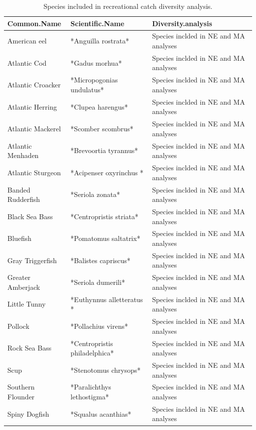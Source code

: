 \documentclass[
]{book}
\begin{document}
\begin{table}

\caption{\label{tab:rec-groups}Species included in recreational catch diversity analysis.}
\centering
\fontsize{8}{10}\selectfont
\begin{tabular}[t]{l|l|l}
\hline
Common.Name & Scientific.Name & Diversity.analysis\\
\hline
American eel & *Anguilla rostrata* & Species inclded in NE and MA analyses\\
\hline
Atlantic Cod & *Gadus morhua* & Species inclded in NE and MA analyses\\
\hline
Atlantic Croacker & *Micropogonias undulatus* & Species inclded in NE and MA analyses\\
\hline
Atlantic Herring & *Clupea harengus* & Species inclded in NE and MA analyses\\
\hline
Atlantic Mackerel & *Scomber scombrus* & Species inclded in NE and MA analyses\\
\hline
Atlantic Menhaden & *Brevoortia tyrannus* & Species inclded in NE and MA analyses\\
\hline
Atlantic Sturgeon & *Acipenser oxyrinchus * & Species inclded in NE and MA analyses\\
\hline
Banded Rudderfish & *Seriola zonata* & Species inclded in NE and MA analyses\\
\hline
Black Sea Bass & *Centropristis striata* & Species inclded in NE and MA analyses\\
\hline
Bluefish & *Pomatomus saltatrix* & Species inclded in NE and MA analyses\\
\hline
Gray Triggerfish & *Balistes capriscus* & Species inclded in NE and MA analyses\\
\hline
Greater Amberjack & *Seriola dumerili* & Species inclded in NE and MA analyses\\
\hline
Little Tunny & *Euthynnus alletteratus * & Species inclded in NE and MA analyses\\
\hline
Pollock & *Pollachius virens* & Species inclded in NE and MA analyses\\
\hline
Rock Sea Bass & *Centropristis philadelphica* & Species inclded in NE and MA analyses\\
\hline
Scup & *Stenotomus chrysops* & Species inclded in NE and MA analyses\\
\hline
Southern Flounder & *Paralichthys lethostigma* & Species inclded in NE and MA analyses\\
\hline
Spiny Dogfish & *Squalus acanthias* & Species inclded in NE and MA analyses\\

\end{tabular}
\end{table}
\end{document}
